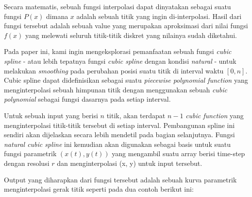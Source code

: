 \documentclass[journal,12pt,onecolumn,a4paper]{IEEEtran}
\begin{document}
Secara matematis, sebuah fungsi interpolasi dapat dinyatakan sebagai suatu fungsi \(P(x)\) dimana \(x\) adalah sebuah titik yang ingin di-interpolasi. Hasil dari fungsi tersebut adalah sebuah value yang merupakan aproksimasi dari nilai fungsi \(f(x)\) yang melewati seluruh titik-titik diskret yang nilainya sudah diketahui.

Pada paper ini, kami ingin mengeksplorasi pemanfaatan sebuah fungsi \emph{cubic spline} - atau lebih tepatnya fungsi \emph{cubic spline} dengan kondisi \emph{natural} - untuk melakukan \emph{smoothing} pada perubahan posisi suatu titik di interval waktu \([0, n]\). Cubic spline dapat didefinisikan sebagai suatu \emph{piecewise polynomial function} yang menginterpolasi sebuah himpunan titik dengan menggunakan sebuah \emph{cubic polynomial} sebagai fungsi dasarnya pada setiap interval.

Untuk sebuah input yang berisi \(n\) titik, akan terdapat \(n-1\) \emph{cubic function} yang menginterpolasi titik-titik tersebut di setiap interval. Pembangunan spline ini sendiri akan dijelaskan secara lebih mendetil pada bagian selanjutnya. Fungsi \emph{natural cubic spline} ini kemudian akan digunakan sebagai basis untuk suatu fungsi parametrik \((x(t), y(t))\) yang mengambil suatu array berisi time-step dengan resolusi \(r\) dan menginterpolasi (x, y) untuk input tersebut.

Output yang diharapkan dari fungsi tersebut adalah sebuah kurva parametrik  menginterpolasi gerak titik seperti pada dua contoh berikut ini:
\end{document}

